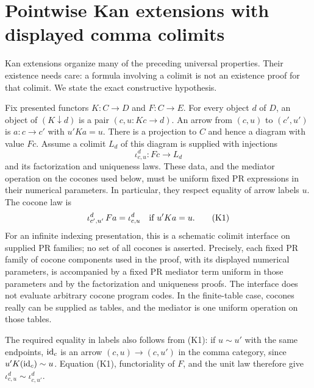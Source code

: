 \section{Pointwise Kan extensions with displayed comma colimits}\label{sec:kan}

Kan extensions organize many of the preceding universal properties. Their
existence needs care: a formula involving a colimit is not an existence
proof for that colimit. We state the exact constructive hypothesis.

Fix presented functors $K:C\to D$ and $F:C\to E$. For every object $d$
of $D$, an object of $(K\downarrow d)$ is a pair $(c,u:Kc\to d)$.
An arrow from $(c,u)$ to $(c',u')$ is $a:c\to c'$ with $u'Ka=u$.
There is a projection to $C$ and hence a diagram with value $Fc$.
Assume a colimit $L_d$ of this diagram is supplied with injections
\[
 \iota^d_{c,u}:Fc\longrightarrow L_d
\]
and its factorization and uniqueness laws. These data, and the mediator
operation on the cocones used below, must be uniform fixed PR expressions
in their numerical parameters. In particular, they respect equality of
arrow labels $u$. The cocone law is
\[
       \iota^d_{c',u'}\,Fa=\iota^d_{c,u}
                    \quad\hbox{if }u'Ka=u.                 \tag{K1}
\]
For an infinite indexing presentation, this is a schematic colimit
interface on supplied PR families; no set of all cocones is asserted.
Precisely, each fixed PR family of cocone components used in the proof,
with its displayed numerical parameters, is accompanied by a fixed PR
mediator term uniform in those parameters and by the factorization and
uniqueness proofs. The interface does not evaluate arbitrary cocone
program codes. In the finite-table case, cocones really can be supplied
as tables, and the mediator is one uniform operation on those tables.

The required equality in labels also follows from (K1): if $u\sim u'$
with the same endpoints, $\operatorname{id}_c$ is an arrow $(c,u)\to(c,u')$ in
the comma category, since $u'K(\operatorname{id}_c)\sim u$. Equation (K1),
functoriality of $F$, and the unit law therefore give
$\iota^d_{c,u}\sim\iota^d_{c,u'}$.


